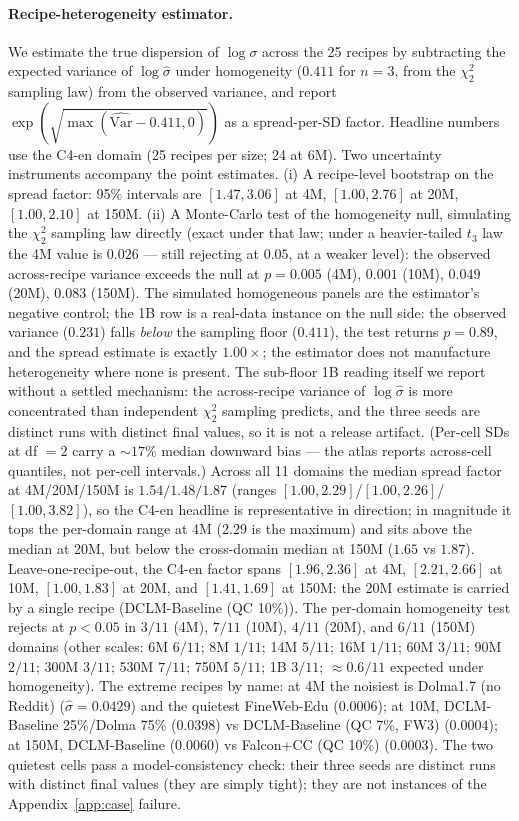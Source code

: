 \paragraph{Recipe-heterogeneity estimator.}
We estimate the true dispersion of
$\log\sigma$ across the 25 recipes by subtracting the expected variance of $\log\hat\sigma$
under homogeneity ($0.411$ for $n = 3$, from the $\chi^2_2$ sampling law) from the observed
variance, and report $\exp(\sqrt{\max(\widehat{\mathrm{Var}} - 0.411, 0)})$ as a
spread-per-SD factor. Headline numbers use the C4-en domain (25 recipes per size; 24 at 6M).
Two uncertainty instruments accompany the point estimates. (i) A recipe-level bootstrap on the
spread factor: 95\% intervals are $[1.47, 3.06]$ at 4M, $[1.00, 2.76]$ at 20M,
$[1.00, 2.10]$ at 150M. (ii) A Monte-Carlo test of the homogeneity null, simulating the
$\chi^2_2$ sampling law directly (exact under that law; under a heavier-tailed $t_3$ law the
4M value is $0.026$ --- still rejecting at $0.05$, at a weaker level): the observed
across-recipe variance exceeds the null at
$p = 0.005$ (4M), $0.001$ (10M), $0.049$ (20M), $0.083$ (150M). The simulated homogeneous
panels are the estimator's negative control; the 1B row is a real-data instance on the null
side: the observed variance ($0.231$) falls \emph{below} the sampling
floor ($0.411$), the test returns $p = 0.89$, and the spread estimate is
exactly $1.00\times$; the estimator does not manufacture heterogeneity where none is present.
The sub-floor 1B reading itself we report without a settled mechanism: the across-recipe
variance of $\log\hat\sigma$ is more concentrated than independent $\chi^2_2$ sampling
predicts, and the three seeds are distinct runs with distinct final values, so it is not a
release artifact.
(Per-cell SDs at df $= 2$ carry a ${\sim}17\%$ median downward bias --- the atlas reports
across-cell quantiles, not per-cell intervals.)
Across all 11 domains the median spread factor at 4M/20M/150M is $1.54/1.48/1.87$ (ranges
$[1.00, 2.29]$/$[1.00, 2.26]$/$[1.00, 3.82]$), so the C4-en headline is representative in
direction; in magnitude it tops the per-domain range at 4M ($2.29$ is the maximum) and sits
above the median at 20M, but below the cross-domain median at 150M ($1.65$ vs $1.87$). Leave-one-recipe-out, the C4-en factor spans
$[1.96, 2.36]$ at 4M, $[2.21, 2.66]$ at 10M, $[1.00, 1.83]$ at 20M, and $[1.41, 1.69]$ at
150M: the 20M estimate is carried by a single recipe (DCLM-Baseline (QC 10\%)). The per-domain
homogeneity test rejects at $p < 0.05$ in $3/11$ (4M), $7/11$ (10M), $4/11$ (20M), and $6/11$
(150M) domains (other scales: 6M $6/11$; 8M $1/11$; 14M $5/11$; 16M $1/11$; 60M $3/11$; 90M
$2/11$; 300M $3/11$; 530M $7/11$; 750M $5/11$; 1B $3/11$; ${\approx}0.6/11$ expected under
homogeneity). The extreme recipes by name: at 4M the noisiest is Dolma1.7 (no Reddit)
($\hat\sigma = 0.0429$) and the quietest FineWeb-Edu ($0.0006$); at 10M, DCLM-Baseline
25\%/Dolma 75\% ($0.0398$) vs DCLM-Baseline (QC 7\%, FW3) ($0.0004$); at 150M, DCLM-Baseline
($0.0060$) vs Falcon+CC (QC 10\%) ($0.0003$). The two quietest cells pass a model-consistency
check: their three seeds are distinct runs with distinct final values (they are simply tight);
they are not instances of the Appendix~\ref{app:case} failure.


